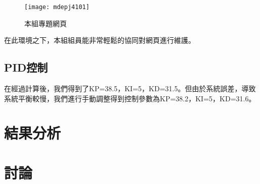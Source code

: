 \begin{figure}[h]
    \centering
    \texttt{[image: mdepj4101]}
    \caption{本組專題網頁}
\end{figure}

在此環境之下，本組組員能非常輕鬆的協同對網頁進行維護。\\




\subsection{PID控制}
在經過計算後，我們得到了KP=38.5，KI=5，KD=31.5。但由於系統誤差，導致系統平衡較慢，我們進行手動調整得到控制參數為KP=38.2，KI=5，KD=31.6。

\subsection{}

\section{結果分析}
\subsection{}
\subsection{}
\subsection{}

\section{討論}
\subsection{}
\subsection{}
\subsection{}
